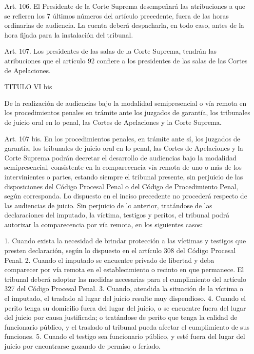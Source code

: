     Art. 106. El Presidente de la Corte Suprema desempeñará las atribuciones a que se refieren los 7 últimos números del artículo precedente, fuera de las horas ordinarias de audiencia. La cuenta deberá despacharla, en todo caso, antes de la hora fijada para la instalación del tribunal.

    Art. 107. Los presidentes de las salas de la Corte Suprema, tendrán las atribuciones que el artículo 92 confiere a los presidentes de las salas de las Cortes de Apelaciones.

    TITULO VI bis
   
    De la realización de audiencias bajo la modalidad semipresencial o vía remota en los procedimientos penales en trámite ante los juzgados de garantía, los tribunales de juicio oral en lo penal, las Cortes de Apelaciones y la Corte Suprema.
   




    Art. 107 bis. En los procedimientos penales, en trámite ante sí, los juzgados de garantía, los tribunales de juicio oral en lo penal, las Cortes de Apelaciones y la Corte Suprema podrán decretar el desarrollo de audiencias bajo la modalidad semipresencial, consistente en la comparecencia vía remota de uno o más de los intervinientes o partes, estando siempre el tribunal presente, sin perjuicio de las disposiciones del Código Procesal Penal o del Código de Procedimiento Penal, según corresponda.
    Lo dispuesto en el inciso precedente no procederá respecto de las audiencias de juicio. Sin perjuicio de lo anterior, tratándose de las declaraciones del imputado, la víctima, testigos y peritos, el tribunal podrá autorizar la comparecencia por vía remota, en los siguientes casos:
   
    1. Cuando exista la necesidad de brindar protección a las víctimas y testigos que presten declaración, según lo dispuesto en el artículo 308 del Código Procesal Penal.
    2. Cuando el imputado se encuentre privado de libertad y deba comparecer por vía remota en el establecimiento o recinto en que permanece. El tribunal deberá adoptar las medidas necesarias para el cumplimiento del artículo 327 del Código Procesal Penal.
    3. Cuando, atendida la situación de la víctima o el imputado, el traslado al lugar del juicio resulte muy dispendioso.
    4. Cuando el perito tenga su domicilio fuera del lugar del juicio, o se encuentre fuera del lugar del juicio por causa justificada; o tratándose de perito que tenga la calidad de funcionario público, y el traslado al tribunal pueda afectar el cumplimiento de sus funciones.
    5. Cuando el testigo sea funcionario público, y esté fuera del lugar del juicio por encontrarse gozando de permiso o feriado.
   
